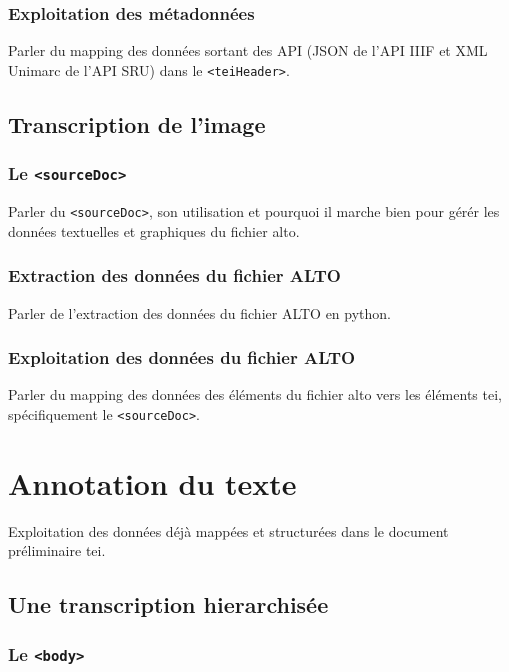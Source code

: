 \documentclass[a4paper,12pt,twoside]{book}
\begin{document}
	\subsection{Exploitation des métadonnées}
	
	Parler du mapping des données sortant des API (JSON de l'API IIIF et XML Unimarc de l'API SRU) dans le \texttt{<teiHeader>}.
	
	\section{Transcription de l'image}
	
	\subsection{Le \texttt{<sourceDoc>}}
	
	Parler du \texttt{<sourceDoc>}, son utilisation et pourquoi il marche bien pour gérér les données textuelles et graphiques du fichier \acrshort{alto}.
	
	\subsection{Extraction des données du fichier ALTO}
	
	Parler de l'extraction des données du fichier ALTO en python.
	
	\subsection{Exploitation des données du fichier ALTO}
	
	Parler du mapping des données des éléments du fichier \acrshort{alto} vers les éléments \acrshort{tei}, spécifiquement le \texttt{<sourceDoc>}.
	
	\chapter{Annotation du texte}
	
	Exploitation des données déjà mappées et structurées dans le document préliminaire \acrshort{tei}.
	
	\section{Une transcription hierarchisée}
	
	\subsection{Le \texttt{<body>}}
	
\end{document}
